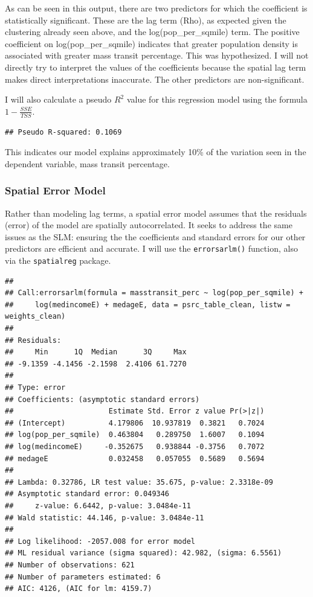 \documentclass[
]{article}
\begin{document}
As can be seen in this output, there are two predictors for which the
coefficient is statistically significant. These are the lag term (Rho),
as expected given the clustering already seen above, and the
log(pop\_per\_sqmile) term. The positive coefficient on
log(pop\_per\_sqmile) indicates that greater population density is
associated with greater mass transit percentage. This was hypothesized.
I will not directly try to interpret the values of the coefficients
because the spatial lag term makes direct interpretations inaccurate.
The other predictors are non-significant.

I will also calculate a pseudo \(R^2\) value for this regression model
using the formula \(1 - \frac{SSE}{TSS}\).

\begin{verbatim}
## Pseudo R-squared: 0.1069
\end{verbatim}

This indicates our model explains approximately 10\% of the variation
seen in the dependent variable, mass transit percentage.

\subsubsection{Spatial Error Model}\label{spatial-error-model}

Rather than modeling lag terms, a spatial error model assumes that the
residuals (error) of the model are spatially autocorrelated. It seeks to
address the same issues as the SLM: ensuring the the coefficients and
standard errors for our other predictors are efficient and accurate. I
will use the \texttt{errorsarlm()} function, also via the
\texttt{spatialreg} package.

\begin{verbatim}
## 
## Call:errorsarlm(formula = masstransit_perc ~ log(pop_per_sqmile) + 
##     log(medincomeE) + medageE, data = psrc_table_clean, listw = weights_clean)
## 
## Residuals:
##     Min      1Q  Median      3Q     Max 
## -9.1359 -4.1456 -2.1598  2.4106 61.7270 
## 
## Type: error 
## Coefficients: (asymptotic standard errors) 
##                      Estimate Std. Error z value Pr(>|z|)
## (Intercept)          4.179806  10.937819  0.3821   0.7024
## log(pop_per_sqmile)  0.463804   0.289750  1.6007   0.1094
## log(medincomeE)     -0.352675   0.938844 -0.3756   0.7072
## medageE              0.032458   0.057055  0.5689   0.5694
## 
## Lambda: 0.32786, LR test value: 35.675, p-value: 2.3318e-09
## Asymptotic standard error: 0.049346
##     z-value: 6.6442, p-value: 3.0484e-11
## Wald statistic: 44.146, p-value: 3.0484e-11
## 
## Log likelihood: -2057.008 for error model
## ML residual variance (sigma squared): 42.982, (sigma: 6.5561)
## Number of observations: 621 
## Number of parameters estimated: 6 
## AIC: 4126, (AIC for lm: 4159.7)
\end{verbatim}
\end{document}
